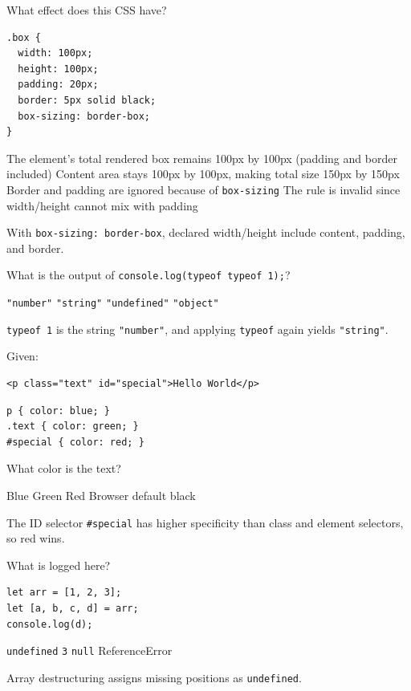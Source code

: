 \question[4]
What effect does this CSS have?
\begin{lstlisting}[style=cssexam]
.box {
  width: 100px;
  height: 100px;
  padding: 20px;
  border: 5px solid black;
  box-sizing: border-box;
}
\end{lstlisting}
\begin{choices}
  \CorrectChoice The element's total rendered box remains 100px by 100px (padding and border included)
  \choice Content area stays 100px by 100px, making total size 150px by 150px
  \choice Border and padding are ignored because of \texttt{box-sizing}
  \choice The rule is invalid since width/height cannot mix with padding
\end{choices}
\begin{solution}
  With \texttt{box-sizing: border-box}, declared width/height include content, padding, and border.
\end{solution}

\question[4]
What is the output of \texttt{console.log(typeof typeof 1);}?
\begin{choices}
  \choice \texttt{"number"}
  \CorrectChoice \texttt{"string"}
  \choice \texttt{"undefined"}
  \choice \texttt{"object"}
\end{choices}
\begin{solution}
  \texttt{typeof 1} is the string \texttt{"number"}, and applying \texttt{typeof} again yields \texttt{"string"}.
\end{solution}

\question[4]
Given:
\begin{lstlisting}[style=htmlexam]
<p class="text" id="special">Hello World</p>
\end{lstlisting}
\begin{lstlisting}[style=cssexam]
p { color: blue; }
.text { color: green; }
#special { color: red; }
\end{lstlisting}
What color is the text?
\begin{choices}
  \choice Blue
  \choice Green
  \CorrectChoice Red
  \choice Browser default black
\end{choices}
\begin{solution}
  The ID selector \texttt{\#special} has higher specificity than class and element selectors, so red wins.
\end{solution}

\question[4]
What is logged here?
\begin{lstlisting}[style=jsexam]
let arr = [1, 2, 3];
let [a, b, c, d] = arr;
console.log(d);
\end{lstlisting}
\begin{choices}
  \CorrectChoice \texttt{undefined}
  \choice \texttt{3}
  \choice \texttt{null}
  \choice ReferenceError
\end{choices}
\begin{solution}
  Array destructuring assigns missing positions as \texttt{undefined}.
\end{solution}

